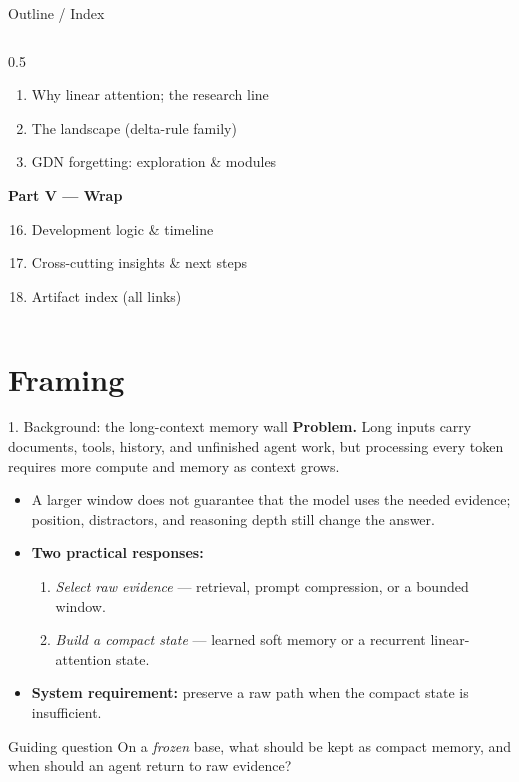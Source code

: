 \documentclass[aspectratio=169]{beamer}
\begin{document}
\begin{frame}{Outline / Index}
\begin{columns}[T]
\begin{column}{0.5\textwidth}
\begin{enumerate}
    \item Why linear attention; the research line
    \item The landscape (delta-rule family)
    \item GDN forgetting: exploration \& modules
  \end{enumerate}
  \vspace{0.6em}
  \textbf{Part V --- Wrap}
  \begin{enumerate}\setcounter{enumi}{15}\small
    \item Development logic \& timeline
    \item Cross-cutting insights \& next steps
    \item Artifact index (all links)
  \end{enumerate}
  \end{column}
  \end{columns}
\end{frame}

\section{Framing}
\begin{frame}{1. Background: the long-context memory wall}
  \textbf{Problem.} Long inputs carry documents, tools, history, and unfinished agent work, but processing
  every token requires more compute and memory as context grows.
  \begin{itemize}
    \item A larger window does not guarantee that the model uses the needed evidence; position,
    distractors, and reasoning depth still change the answer.
    \item \textbf{Two practical responses:}
    \begin{enumerate}
      \item \emph{Select raw evidence} --- retrieval, prompt compression, or a bounded window.
      \item \emph{Build a compact state} --- learned soft memory or a recurrent linear-attention state.
    \end{enumerate}
    \item \textbf{System requirement:} preserve a raw path when the compact state is insufficient.
  \end{itemize}
  \vspace{0.4em}
  \begin{block}{Guiding question}
  On a \emph{frozen} base, what should be kept as compact memory, and when should an agent return to raw evidence?
  \end{block}
\end{frame}
\end{document}
